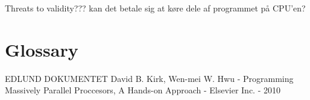 \documentclass[oribibl]{llncs}
\begin{document}
	
	Threats to validity???
	kan det betale sig at køre dele af programmet på CPU'en?
		
	\section{Glossary}
	
	
		
	\begin{thebibliography}{9}
			 EDLUND DOKUMENTET
			 David B. Kirk, Wen-mei W. Hwu - Programming Massively Parallel Proccesors, A Hands-on Approach - Elsevier Inc. - 2010
	\end{thebibliography}
	
\end{document}
